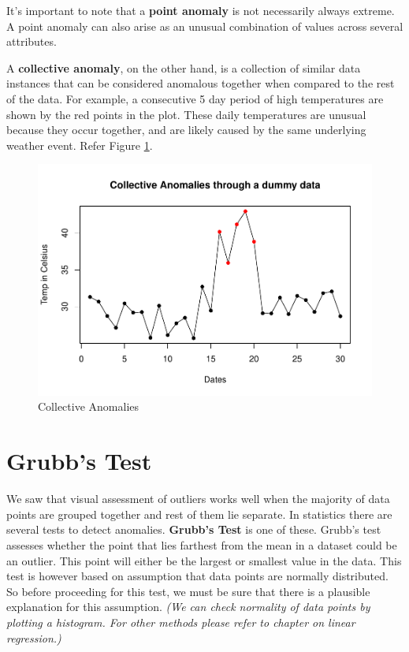 \documentclass[
]{book}
\begin{document}
It's important to note that a \textbf{point anomaly} is not necessarily always extreme. A point anomaly can also arise as an unusual combination of values across several attributes.

A \textbf{collective anomaly}, on the other hand, is a collection of similar data instances that can be considered anomalous together when compared to the rest of the data. For example, a consecutive 5 day period of high temperatures are shown by the red points in the plot. These daily temperatures are unusual because they occur together, and are likely caused by the same underlying weather event. Refer Figure \ref{fig:an2}.

\begin{figure}

{\centering \includegraphics[height=0.27\textheight]{DauR_files/figure-latex/an2-1} 

}

\caption{Collective Anomalies}\label{fig:an2}
\end{figure}

\hypertarget{grubbs-test}{%
\section{Grubb's Test}\label{grubbs-test}}

We saw that visual assessment of outliers works well when the majority of data points are grouped together and rest of them lie separate. In statistics there are several tests to detect anomalies. \textbf{Grubb's Test} is one of these. Grubb's test assesses whether the point that lies farthest from the mean in a dataset could be an outlier. This point will either be the largest or smallest value in the data. This test is however based on assumption that data points are normally distributed. So before proceeding for this test, we must be sure that there is a plausible explanation for this assumption. \emph{(We can check normality of data points by plotting a histogram. For other methods please refer to chapter on linear regression.)}
\end{document}
